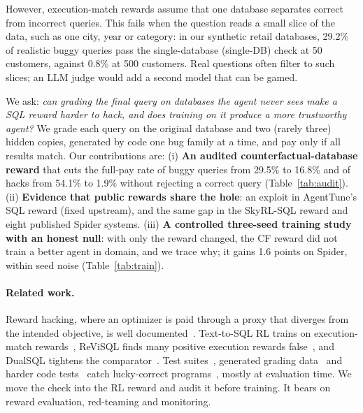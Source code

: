 \documentclass{article}
\begin{document}
However, execution-match rewards assume that one database separates correct from incorrect queries. This fails when the question reads a small slice of the data, such as one city, year or category: in our synthetic retail databases, 29.2\% of realistic buggy queries pass the single-database (single-DB) check at 50 customers, against 0.8\% at 500 customers. %
Real questions often filter to such slices; an LLM judge would add a second model that can be gamed.

We ask: \emph{can grading the final query on databases the agent never sees make a SQL reward harder to hack, and does training on it produce a more trustworthy agent?} We grade each query on the original database and two (rarely three) hidden copies, generated by code one bug family at a time, and pay only if all results match. Our contributions are:
(i) \textbf{An audited counterfactual-database reward} that cuts the full-pay rate of buggy queries from 29.5\% to 16.8\% and of hacks from 54.1\% to 1.9\% without rejecting a correct query (Table~\ref{tab:audit}).
(ii) \textbf{Evidence that public rewards share the hole}: an exploit in AgentTune's SQL reward (fixed upstream), and the same gap in the SkyRL-SQL reward and eight published Spider systems.
(iii) \textbf{A controlled three-seed training study with an honest null}: with only the reward changed, the CF reward did not train a better agent in domain, and we trace why; it gains 1.6 points on Spider, within seed noise (Table~\ref{tab:train}).

\paragraph{Related work.}
Reward hacking, where an optimizer is paid through a proxy that diverges from the intended objective, is well documented~\citep{amodei2016concrete,skalse2022defining,gao2023scaling}. Text-to-SQL RL trains on execution-match rewards~\citep{ma2026sql,pourreza2025reasoningsql,yao2026arctic}, ReViSQL finds many positive execution rewards false~\citep{zhu2026humanleveltexttosqlreinforcementlearning}, and DualSQL tightens the comparator~\citep{chen2026dualsql}. Test suites~\citep{zhong2020semantic,zhang2026progresssql}, generated grading data~\citep{chandra2015data,habibollah2026synsql} and harder code tests~\citep{he2026hardtestgen} catch lucky-correct programs~\citep{pasupat2016inferring}, mostly at evaluation time. We move the check into the RL reward and audit it before training. It bears on reward evaluation, red-teaming and monitoring.
\end{document}
